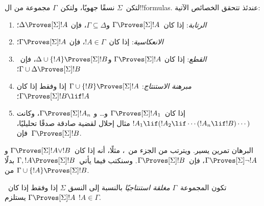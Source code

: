 \documentclass[../../../include/open-logic-section]{subfiles}
\begin{document}


\begin{prop}
  لتكن~$\Sigma$ نسقًا جهويًا، ولتكن~$\Gamma$ مجموعة من ال!!{formula}s.
  عندئذ تتحقق الخصائص الآتية:
  \begin{enumerate}
  \item{} \emph{الرتابة}: إذا
    كان~$\Gamma \Proves[\Sigma] !A$ و$\Gamma \subseteq \Delta$، فإن
    $\Delta \Proves[\Sigma] !A$؛
  \item{}
    \emph{الانعكاسية}: إذا كان~$!A \in \Gamma$، فإن
    $\Gamma \Proves[\Sigma] !A$؛
  \item{} \emph{القطع}: إذا كان
    $\Gamma \Proves[\Sigma] !A$ و$\Delta \cup \{!A\}
    \Proves[\Sigma] !B$، فإن~$\Gamma \cup \Delta \Proves[\Sigma] !B$؛
  \item{} \emph{مبرهنة الاستنتاج}:
    $\Gamma \cup \{!B\} \Proves[\Sigma] !A$ إذا وفقط إذا كان
    $\Gamma \Proves[\Sigma] !B \lif !A$؛
  \item {}%
    إذا كان~$\Gamma \Proves[\Sigma] !A_1$ و\dots{} و
    $\Gamma \Proves[\Sigma] !A_n$، وكانت
    $!A_1 \lif (!A_2 \lif \cdots (!A_n \lif !B)\cdots)$ مثال إحلال
    لقضية صادقة صدقًا تحليليًا، فإن~$\Gamma \Proves[\Sigma] !B$.
  \end{enumerate}
\end{prop}

البرهان تمرين يسير. ويترتب من الجزء
 من~،
مثلًا، أنه إذا كان~$\Gamma \Proves[\Sigma] !A \lor !B$ و
$\Gamma \Proves[\Sigma] \lnot !A$، فإن~$\Gamma \Proves[\Sigma] !B$.
وسنكتب فيما يأتي~$\Gamma, !A \Proves[\Sigma] !B$ بدلًا من
$\Gamma \cup \{!A\} \Proves[\Sigma] !B$.

\begin{defn}
  تكون المجموعة~$\Gamma$ \emph{مغلقة استنتاجيًا} بالنسبة إلى النسق
  $\Sigma$ إذا وفقط إذا كان~$\Gamma \Proves[\Sigma] !A$ يستلزم
  $!A \in \Gamma$.
\end{defn}
\end{document}
